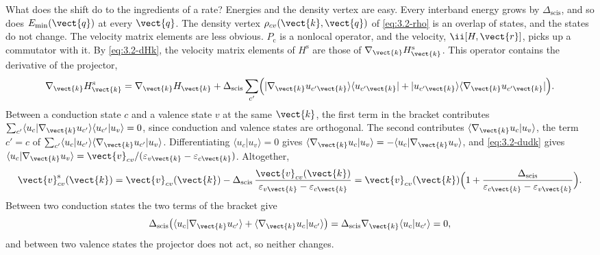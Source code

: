 What does the shift do to the ingredients of a rate? Energies and the density vertex are easy. Every interband energy grows by $\Delta_{\mathrm{scis}}$, and so does $E_{\mathrm{min}}(\vect{q})$ at every $\vect{q}$. The density vertex $\rho_{cv}(\vect{k}, \vect{q})$ of \cref{eq:3.2-rho} is an overlap of states, and the states do not change. The velocity matrix elements are less obvious. $P_{\mathrm{c}}$ is a nonlocal operator, and the velocity, $\ii[H, \vect{r}]$, picks up a commutator with it. By \cref{eq:3.2-dHk}, the velocity matrix elements of $H^{\mathrm{s}}$ are those of $\nabla_{\vect{k}}H^{\mathrm{s}}_{\vect{k}}$. This operator contains the derivative of the projector,
\begin{equation*}
  \nabla_{\vect{k}}H^{\mathrm{s}}_{\vect{k}} = \nabla_{\vect{k}}H_{\vect{k}} + \Delta_{\mathrm{scis}}\sum_{c'}\Bigl(|\nabla_{\vect{k}}u_{c'\vect{k}}\rangle\langle u_{c'\vect{k}}| + |u_{c'\vect{k}}\rangle\langle\nabla_{\vect{k}}u_{c'\vect{k}}|\Bigr) .
\end{equation*}
Between a conduction state $c$ and a valence state $v$ at the same $\vect{k}$, the first term in the bracket contributes $\sum_{c'}\langle u_c|\nabla_{\vect{k}}u_{c'}\rangle\langle u_{c'}|u_v\rangle = 0$, since conduction and valence states are orthogonal. The second contributes $\langle\nabla_{\vect{k}}u_c|u_v\rangle$, the term $c' = c$ of $\sum_{c'}\langle u_c|u_{c'}\rangle\langle\nabla_{\vect{k}}u_{c'}|u_v\rangle$. Differentiating $\langle u_c|u_v\rangle = 0$ gives $\langle\nabla_{\vect{k}}u_c|u_v\rangle = -\langle u_c|\nabla_{\vect{k}}u_v\rangle$, and \cref{eq:3.2-dudk} gives $\langle u_c|\nabla_{\vect{k}}u_v\rangle = \vect{v}_{cv}/(\varepsilon_{v\vect{k}} - \varepsilon_{c\vect{k}})$. Altogether,
\begin{equation*}
  \vect{v}^{\mathrm{s}}_{cv}(\vect{k}) = \vect{v}_{cv}(\vect{k}) - \Delta_{\mathrm{scis}}\,\frac{\vect{v}_{cv}(\vect{k})}{\varepsilon_{v\vect{k}} - \varepsilon_{c\vect{k}}}
  = \vect{v}_{cv}(\vect{k})\Bigl(1 + \frac{\Delta_{\mathrm{scis}}}{\varepsilon_{c\vect{k}} - \varepsilon_{v\vect{k}}}\Bigr) .
\end{equation*}
Between two conduction states the two terms of the bracket give
\begin{equation*}
  \Delta_{\mathrm{scis}}\bigl(\langle u_c|\nabla_{\vect{k}}u_{c'}\rangle + \langle\nabla_{\vect{k}}u_c|u_{c'}\rangle\bigr) = \Delta_{\mathrm{scis}}\nabla_{\vect{k}}\langle u_c|u_{c'}\rangle = 0 ,
\end{equation*}
and between two valence states the projector does not act, so neither changes.
